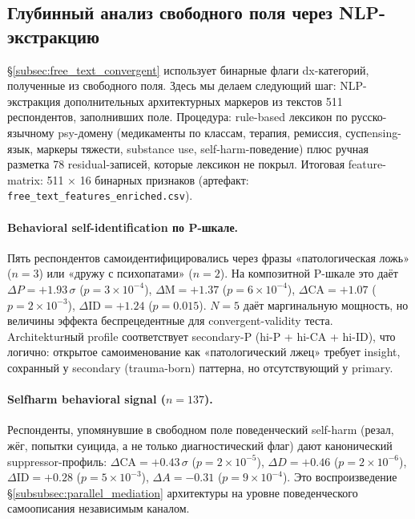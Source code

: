\subsection{Глубинный анализ свободного поля через NLP-экстракцию}
\label{subsec:free_text_nlp}

§\ref{subsec:free_text_convergent} использует бинарные флаги dx-категорий, полученные из свободного поля. Здесь мы делаем следующий шаг: NLP-экстракция дополнительных архитектурных маркеров из текстов 511 респондентов, заполнивших поле. Процедура: rule-based лексикон по русско-язычному psy-домену (медикаменты по классам, терапия, ремиссия, суспensing-язык, маркеры тяжести, substance use, self-harm-поведение) плюс ручная разметка 78 residual-записей, которые лексикон не покрыл. Итоговая feature-matrix: 511 × 16 бинарных признаков (артефакт: \texttt{free\_text\_features\_enriched.csv}).

\paragraph{Behavioral self-identification по P-шкале.} Пять респондентов самоидентифицировались через фразы «патологическая ложь» ($n = 3$) или «дружу с психопатами» ($n = 2$). На композитной P-шкале это даёт $\Delta P = +1.93\,\sigma$ ($p = 3 \times 10^{-4}$), $\Delta \text{M} = +1.37$ ($p = 6 \times 10^{-4}$), $\Delta \text{CA} = +1.07$ ($p = 2 \times 10^{-3}$), $\Delta \text{ID} = +1.24$ ($p = 0.015$). $N = 5$ даёт маргинальную мощность, но величины эффекта беспрецедентные для convergent-validity теста. Architekturный profile соответствует secondary-P (hi-P + hi-CA + hi-ID), что логично: открытое самоименование как «патологический лжец» требует insight, сохранный у secondary (trauma-born) паттерна, но отсутствующий у primary.

\paragraph{Selfharm behavioral signal ($n = 137$).} Респонденты, упомянувшие в свободном поле поведенческий self-harm (резал, жёг, попытки суицида, а не только диагностический флаг) дают канонический suppressor-профиль: $\Delta \text{CA} = +0.43\,\sigma$ ($p = 2 \times 10^{-5}$), $\Delta D = +0.46$ ($p = 2 \times 10^{-6}$), $\Delta \text{ID} = +0.28$ ($p = 5 \times 10^{-3}$), $\Delta A = -0.31$ ($p = 9 \times 10^{-4}$). Это воспроизведение §\ref{subsubsec:parallel_mediation} архитектуры на уровне поведенческого самоописания независимым каналом.

